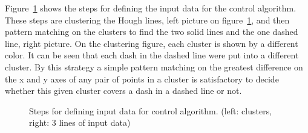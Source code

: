 \documentclass[Report.tex]{subfiles}
\begin{document}
Figure~\ref{fig:inputdata} shows the steps for defining the input data for the
control algorithm. These steps are clustering the Hough lines, left picture on
figure~\ref{fig:inputdata}, and then pattern matching on the clusters to find
the two solid lines and the one dashed line, right picture. On the clustering
figure, each cluster is shown by a different color.  It can be seen that each
dash in the dashed line were put into a different cluster. By this strategy a
simple pattern matching on the greatest difference on the x and y axes of any
pair of points in a cluster is satisfactory to decide whether this given
cluster covers a dash in a dashed line or not.

\begin{figure}[hp]
  \centering
  \setlength\fboxsep{2pt}
  \setlength\fboxrule{0pt}

  \caption{Steps for defining input data for control algorithm. (left:
  clusters, right: 3 lines of input data)}
  \label{fig:inputdata}
\end{figure}
\end{document}

